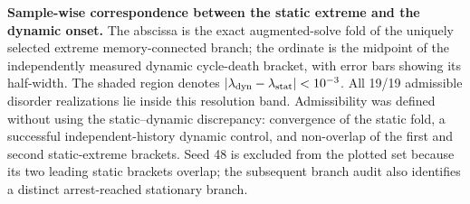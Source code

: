 \textbf{Sample-wise correspondence between the static extreme and the dynamic onset.} The abscissa is the exact augmented-solve fold of the uniquely selected extreme memory-connected branch; the ordinate is the midpoint of the independently measured dynamic cycle-death bracket, with error bars showing its half-width. The shaded region denotes $|\lambda_{\rm dyn}-\lambda_{\rm stat}|<10^{-3}$. All 19/19 admissible disorder realizations lie inside this resolution band. Admissibility was defined without using the static--dynamic discrepancy: convergence of the static fold, a successful independent-history dynamic control, and non-overlap of the first and second static-extreme brackets. Seed 48 is excluded from the plotted set because its two leading static brackets overlap; the subsequent branch audit also identifies a distinct arrest-reached stationary branch.
